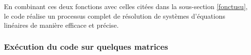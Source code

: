 \documentclass{report}
\begin{document}
En combinant ces deux fonctions avec celles citées dans la sous-section \ref{fonctusu}, le code réalise un processus complet de résolution de systèmes d'équations linéaires de manière efficace et précise.\\
\subsubsection{Exécution du code sur quelques matrices}
\end{document}
